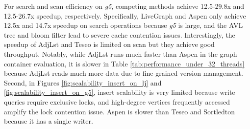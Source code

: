 For search and scan efficiency on \emph{g5}, competing methods achieve 12.5-29.8x and 12.5-26.7x speedup, respectively. Specifically, LiveGraph and Aspen only achieve 12.5x and 14.7x speedup on search operations because \emph{g5} is large, and the AVL tree and bloom filter lead to severe cache contention issues. Interestingly, the speedup of AdjLst and Teseo is limited on scan but they achieve good throughput.  Notably, while AdjLst runs much faster than Aspen in the graph container evaluation, it is slower in Table \ref{tab:performance_under_32_threads} because AdjLst reads much more data due to fine-grained version management.  Second, in Figures \ref{fig:scalability_insert_on_lj} and \ref{fig:scalability_insert_on_g5}, insert scalability is very limited because write queries require exclusive locks, and high-degree vertices frequently accessed amplify the lock contention issue.  Aspen is slower than Teseo and Sortledton because it has a single writer.

